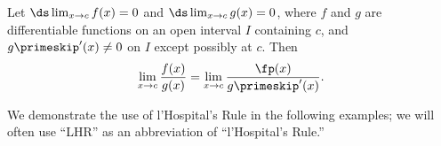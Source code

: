 {Let $\ds \lim_{x\to c}f(x) = 0$ and $\ds \lim_{x\to c}g(x)=0$, where $f$ and $g$ are differentiable functions on an open interval $I$ containing $c$, and $g\primeskip'(x)\neq 0$ on $I$ except possibly at $c$. Then 
\[
 \lim_{x\to c} \frac{f(x)}{g(x)} = \lim_{x\to c} \frac{\fp(x)}{g\primeskip'(x)}.
\]
}

We demonstrate the use of l'Hospital's Rule in the following examples; we will often use ``LHR'' as an abbreviation of ``l'Hospital's Rule.''\\

{}

